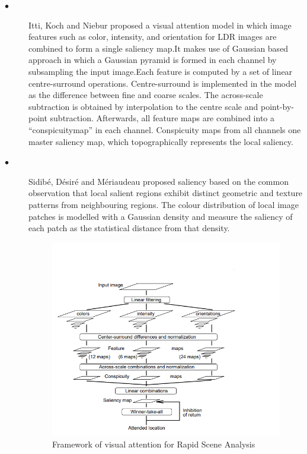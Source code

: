 \begin{description}
  \item[$\bullet$]Itti, Koch and Niebur\cite{itti1998model}   proposed a visual attention
  model in which image features such as color, intensity, and
orientation for LDR images are combined to form a single saliency map.It makes use of Gaussian based approach in
which a Gaussian pyramid is formed in each channel by subsampling the input image.Each feature is computed by a set of linear centre-surround operations. Centre-surround is implemented in the model as the difference between fine and coarse scales. The across-scale subtraction is obtained by interpolation to the centre scale and point-by-point
subtraction. Afterwards, all feature maps are combined into a “conspicuitymap” in each channel. Conspicuity maps from all channels one master saliency map, which topographically represents the local saliency.


\item[$\bullet$] Sidib{\'e}, D{\'e}sir{\'e} and M{\'e}riaudeau\cite{sidibe2016visual}  proposed saliency  based on the common observation
that local salient regions exhibit distinct geometric and texture patterns
from neighbouring regions. The colour distribution of local image
patches is modelled with a Gaussian density and measure the saliency
of each patch as the statistical distance from that density.


\begin{figure}[h!]
  \centering
  \includegraphics[width=1\textwidth,height=1\textwidth]{pictures/figure1.png}
  \caption[]{Framework of visual attention for Rapid Scene Analysis \cite{itti1998model}}
  \label{orangeleaf}


\end{figure}
\end{description}
